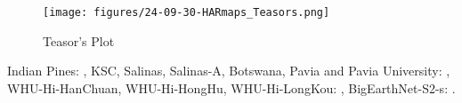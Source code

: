\begin{figure}[htbp]
    \centering
    \texttt{[image: figures/24-09-30-HARmaps\_Teasors.png]}
    \caption{Teasor's Plot}
    \label{fig:tp}
\end{figure}

\newpage

Indian Pines: \cite{PURR1947}, KSC, Salinas, Salinas-A, Botswana, Pavia and Pavia University: \cite{pavia_datasets}, WHU-Hi-HanChuan, WHU-Hi-HongHu, WHU-Hi-LongKou: \cite{zhongMiniUAVborneHyperspectralRemote2018, huWHUhiUAVborneHyperspectral}, BigEarthNet-S2-s: \cite{clasen2024refinedbigearthnet, hackel2024configilm}.

\newpage